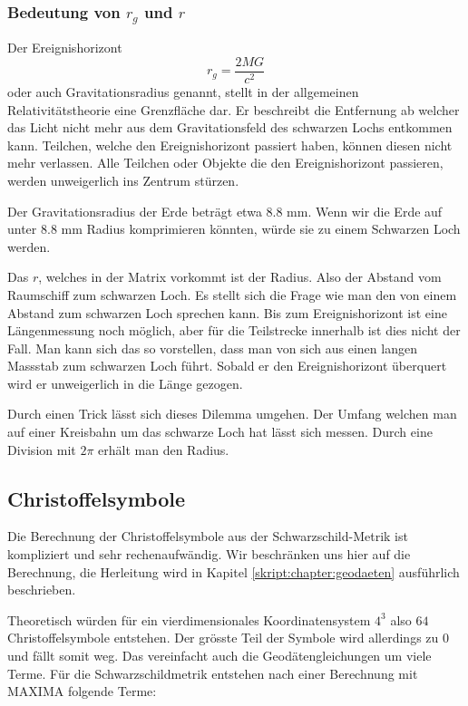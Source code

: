 \begin{refsection}
	\subsubsection{Bedeutung von $r_{g}$ und $r$}
 	Der Ereignishorizont 
     \begin{equation} \label{Gravitationsradius}
     r_{g}= \frac{2MG}{c^2}
     \end{equation}
     oder auch Gravitationsradius genannt, stellt in der allgemeinen Relativitätstheorie eine Grenzfläche dar. Er beschreibt die Entfernung ab welcher das Licht nicht mehr aus dem Gravitationsfeld des schwarzen Lochs entkommen kann. Teilchen, welche den Ereignishorizont passiert haben, können diesen nicht mehr verlassen. Alle Teilchen oder Objekte die den Ereignishorizont passieren, werden unweigerlich ins Zentrum stürzen. 
	
	Der Gravitationsradius der Erde beträgt etwa 8.8 mm. Wenn wir die Erde auf unter 8.8 mm Radius komprimieren könnten, würde sie zu einem Schwarzen Loch werden.
    
    Das $r$, welches in der Matrix vorkommt ist der Radius. Also der Abstand vom Raumschiff zum schwarzen Loch. Es stellt sich die Frage wie man den von einem Abstand zum schwarzen Loch sprechen kann. Bis zum Ereignishorizont ist eine Längenmessung noch möglich, aber für die Teilstrecke innerhalb ist dies nicht der Fall. Man kann sich das so vorstellen, dass man von sich aus einen langen Massstab zum schwarzen Loch führt. Sobald er den Ereignishorizont überquert wird er unweigerlich in die Länge gezogen.
    
    Durch einen Trick lässt sich dieses Dilemma umgehen. Der Umfang welchen man auf einer Kreisbahn um das schwarze Loch hat lässt sich messen. Durch eine Division mit $2\pi$ erhält man den Radius.
	
	\subsection{Christoffelsymbole}\label{christoffel}
	
	Die Berechnung der Christoffelsymbole aus der Schwarzschild-Metrik ist kompliziert und sehr rechenaufwändig. Wir beschränken uns hier auf die Berechnung, die Herleitung wird in Kapitel \ref{skript:chapter:geodaeten} ausführlich beschrieben. 
	
	Theoretisch würden für ein vierdimensionales Koordinatensystem $4^{3}$ also $64$ Christoffelsymbole entstehen. Der grösste Teil der Symbole wird allerdings zu $0$ und fällt somit weg. Das vereinfacht auch die Geodätengleichungen um viele Terme. 
	Für die Schwarzschildmetrik entstehen nach einer Berechnung mit MAXIMA folgende Terme:
	

\end{refsection}
